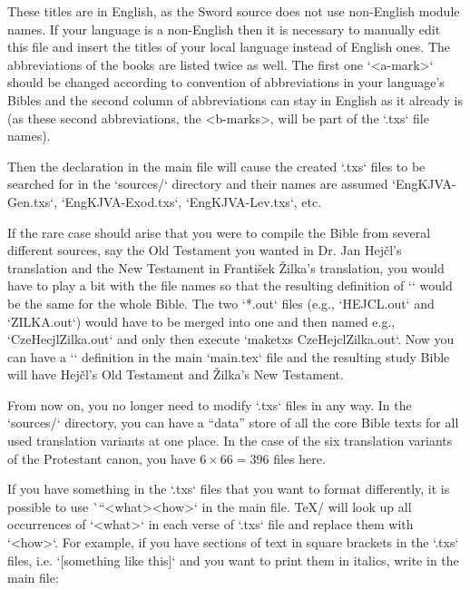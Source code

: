 These titles are in English, as the Sword source does not use non-English module names. 
If your language is a non-English then it is necessary to manually edit this file and insert the titles of your local language instead of English ones.
The abbreviations of the books are listed twice as well. The first one `<a-mark>` should be changed according to convention of abbreviations in your language's Bibles and the second column of abbreviations can stay in English as it already is (as these second abbreviations, the <b-marks>, will be part of the `.txs` file names).  

Then the declaration 
\begtt
\def\txsfile {sources/Eng\tmark-\bmark.txs}
\endtt
in the main file will cause the created `.txs` files to be searched for 
in the `sources/` directory and their names are assumed
`EngKJVA-Gen.txs`, `EngKJVA-Exod.txs`, `EngKJVA-Lev.txs`, etc.

If the rare case should arise that you were to compile the Bible from several different sources, say the Old Testament you wanted in Dr. Jan Hejčl's translation and the New Testament in František Žilka's translation, you would have to play a bit with the file names so that the resulting definition of `\tmark` would be the same for the whole Bible. The two `*.out` files (e.g., `HEJCL.out` and `ZILKA.out`) would have to be merged into one and then named e.g., `CzeHecjlZilka.out` and  only then execute `maketxs CzeHejclZilka.out`.  Now you can have a `\def\tmark{HejclZilka}` definition in the main `main.tex` file and 
the resulting study Bible will have Hejčl's Old Testament and Žilka's New Testament.




From now on, you no longer need to modify  `.txs` files in any way.
In the `sources/` directory, you can have a “data” store of all the core Bible texts for all used translation variants at one place. In the case of the six translation variants
of the Protestant canon, you have $6 \times 66=396$ files here.



If you have something in the `.txs` files that you want to format differently, it is 
possible to use \`\cnvtext``{<what>}{<how>}` in the main file. 
\TeX/  will look up all occurrences of `<what>` in each verse of `.txs` file and replace them with `<how>`.
For example, if you have sections of text in square brackets in the `.txs` files, i.e.
`[something like this]` and you want to print them in italics, write in the main file:
\begtt
\cnvtext{[}{\bgroup\it} \cnvtext{]}{\/\egroup}
\endtt

